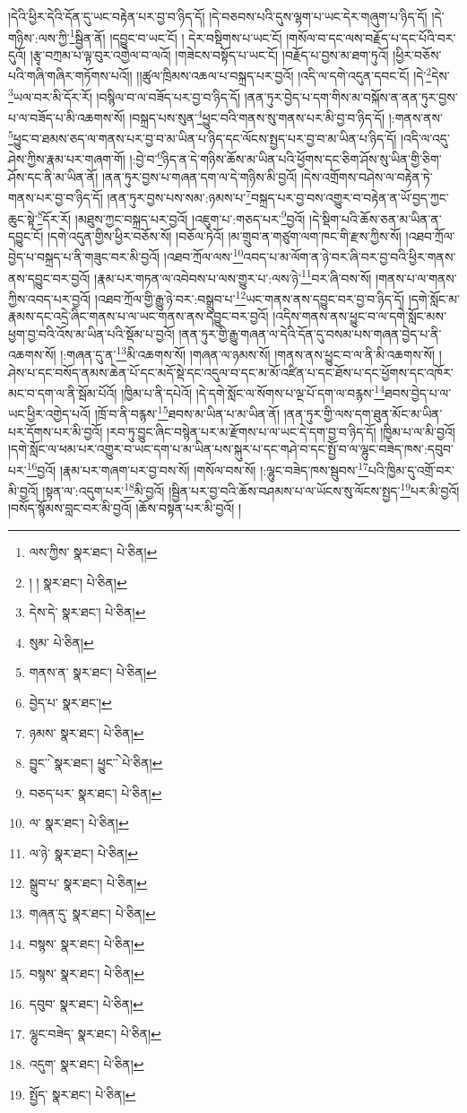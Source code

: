 །དེའི་ཕྱིར་དེའི་དོན་དུ་ཡང་བརྟེན་པར་བྱ་བ་ཉིད་དོ། །དེ་བཅབས་པའི་དུས་ལྷག་པ་ཡང་དེར་གཞུག་པ་ཉིད་དོ། །དེ་གཉིས་:ལས་ཀྱི་\footnote{ལས་ཀྱིས་  སྣར་ཐང་།  པེ་ཅིན། }སྦྱིན་ནོ། །དབྱུང་བ་ཡང་ངོ། །
དེར་བསྡིགས་པ་ཡང་ངོ། །གསོལ་བ་དང་ལས་བརྗོད་པ་དང་པོའི་བར་དུའོ། །རྩྭ་བཀྲམ་པ་ལྟ་བུར་འགྱེལ་བ་ལའོ། །གཟེངས་བསྟོད་པ་ཡང་ངོ། །བརྗོད་པ་བྱས་མ་ཐག་ཏུའོ། །ཕྱིར་བཅོས་པའི་གཞི་གཞིར་གཏོགས་པའོ།། །།ཚུལ་ཁྲིམས་འཆལ་པ་བསྐྲད་པར་བྱའོ། །འདི་ལ་དགེ་འདུན་དབང་ངོ། །དེ་\footnote{། །  སྣར་ཐང་།  པེ་ཅིན། }དེས་\footnote{དེས་དེ་  སྣར་ཐང་།  པེ་ཅིན། }ཡལ་བར་མི་དོར་རོ། །བསྙིལ་བ་ལ་བཟོད་པར་བྱ་བ་ཉིད་དོ། །ནན་ཏུར་བྱེད་པ་དག་གིས་མ་བསྐོས་ན་ནན་ཏུར་བྱས་པ་ལ་བཟོད་པ་མི་འཆགས་སོ། །བསྐྲད་པས་སུན་\footnote{སུམ་  པེ་ཅིན། }ཕྱུང་བའི་གནས་སུ་གནས་པར་མི་བྱ་བ་ཉིད་དོ། །:གནས་ནས་\footnote{གནས་ན་  སྣར་ཐང་།  པེ་ཅིན། }ཕྱུང་བ་ཐམས་ཅད་ལ་གནས་པར་བྱ་བ་མ་ཡིན་པ་ཉིད་དང་ལོངས་སྤྱད་པར་བྱ་བ་མ་ཡིན་པ་ཉིད་དོ། །འདི་ལ་འདུ་ཤེས་ཀྱིས་རྣམ་པར་གཞག་གོ། །:བྱེ་བ་\footnote{བྱེད་པ་  སྣར་ཐང་། }ཉིད་ན་དེ་གཉིས་ཆོས་མ་ཡིན་པའི་ཕྱོགས་དང་ཅིག་ཤོས་སུ་ཡིན་གྱི་ཅིག་ཤོས་དང་ནི་མ་ཡིན་ནོ། །ནན་ཏུར་བྱས་པ་གཞན་དག་ལ་དེ་གཉིས་མི་བྱའོ། །དེས་འགྲོགས་བཤེས་ལ་བརྟེན་ཏེ་གནས་པར་བྱ་བ་ཉིད་དོ། །ནན་ཏུར་བྱས་པས་སམ་:ཉམས་པ་\footnote{ཉམས་  སྣར་ཐང་།  པེ་ཅིན། }བསྐྲད་པར་བྱ་བས་འགྱུར་བ་བརྟེན་ན་ཡོ་བྱད་ཀྱང་ཆུང་སྟེ་\footnote{བྱུང་ེ་  སྣར་ཐང་། ཕྱུང་ེ་  པེ་ཅིན། }དོར་རོ། །མཐུས་ཀྱང་བསྐྲད་པར་བྱའོ། །འཇུག་པ་:གཅད་པར་\footnote{བཅད་པར་  སྣར་ཐང་།  པེ་ཅིན། }བྱའོ། །དེ་སྡིག་པའི་ཆོས་ཅན་མ་ཡིན་ན་དབྱུང་ངོ། །དགེ་འདུན་གྱིས་ཕྱིར་བཅོས་སོ། །བཅོལ་ཏེའོ། །མ་གྲུབ་ན་གཙུག་ལག་ཁང་གི་རྫས་ཀྱིས་སོ། །འཐབ་ཀྲོལ་བྱེད་པ་བསྐྲད་པ་ནི་གཟུང་བར་མི་བྱའོ། །འཐབ་ཀྲོལ་ལས་\footnote{ལ་  སྣར་ཐང་།  པེ་ཅིན། }འབད་པ་མ་ལོག་ན་ཉེ་བར་ཞི་བར་བྱ་བའི་ཕྱིར་གནས་ནས་དབྱུང་བར་བྱའོ། །རྣམ་པར་གཏན་ལ་འབེབས་པ་ལས་གྱུར་པ་:ལས་ཉེ་\footnote{ལ་ཉེ་  སྣར་ཐང་།  པེ་ཅིན། }བར་ཞི་བས་སོ། །གནས་པ་ལ་གནས་ཀྱིས་འབད་པར་བྱའོ། །འཐབ་ཀྲོལ་གྱི་རྒྱུ་ཉེ་བར་:བསྒྲུབ་པ་\footnote{སྒྲུབ་པ་  སྣར་ཐང་།  པེ་ཅིན། }ཡང་གནས་ནས་དབྱུང་བར་བྱ་བ་ཉིད་དོ། །དགེ་སློང་མ་རྣམས་དང་འདྲེ་ཞིང་གནས་པ་ལ་ཡང་གནས་ནས་དབྱུང་བར་བྱའོ། །འདིས་གནས་ནས་ཕྱུང་བ་ལ་དགེ་སློང་མས་ཕྱག་བྱ་བའི་འོས་མ་ཡིན་པའི་སྡོམ་པ་བྱའོ། །ནན་ཏུར་གྱི་རྒྱུ་གཞན་ལ་དེའི་དོན་དུ་བསམ་པས་གཞན་བྱེད་པ་ནི་འཆགས་སོ། །:གཞན་དུ་ན་\footnote{གཞན་དུ་  སྣར་ཐང་།  པེ་ཅིན། }མི་འཆགས་སོ། །གཞན་ལ་ཉམས་སོ། །གནས་ནས་ཕྱུང་བ་ལ་ནི་མི་འཆགས་སོ། །ཤེས་པ་དང་བསོད་ནམས་ཆེན་པོ་དང་མདོ་སྡེ་དང་འདུལ་བ་དང་མ་མོ་འཛིན་པ་དང་ཐོས་པ་དང་ཕྱོགས་དང་འཁོར་མང་བ་དག་ལ་ནི་སྦོམ་པོའོ། །ཁྱིམ་པ་ནི་དཔེའོ། །དེ་དགེ་སློང་ལ་སོགས་པ་ལྔ་པོ་དག་ལ་བརྙས་\footnote{བསྙས་  སྣར་ཐང་།  པེ་ཅིན། }ཐབས་བྱེད་པ་ལ་ཡང་ཕྱིར་འགྱེད་པའོ། །ཁྲོ་བ་ནི་བརྙས་\footnote{བསྙས་  སྣར་ཐང་།  པེ་ཅིན། }ཐབས་མ་ཡིན་པ་མ་ཡིན་ནོ། །ནན་ཏུར་གྱི་ལས་དག་ཐུན་མོང་མ་ཡིན་པར་དོགས་པར་མི་བྱའོ། །རབ་ཏུ་བྱུང་ཞིང་བསྙེན་པར་མ་རྫོགས་པ་ལ་ཡང་དེ་དག་བྱ་བ་ཉིད་དོ། །ཁྱིམ་པ་ལ་མི་བྱའོ། །དགེ་སློང་ལ་ཕམ་པར་འགྱུར་བ་ཡང་དག་པ་མ་ཡིན་པས་སྐུར་པ་དང་གཤེ་བ་དང་སྤྱོ་བ་ལ་ལྷུང་བཟེད་ཁས་:དབུབ་པར་\footnote{དབུབ་  སྣར་ཐང་།  པེ་ཅིན། }བྱའོ། །རྣམ་པར་གཞག་པར་བྱ་བས་སོ། །གསོལ་བས་སོ། །:ལྷུང་བཟེད་ཁས་སྦུབས་\footnote{ལྷུང་བཟེད་  སྣར་ཐང་།  པེ་ཅིན། }པའི་ཁྱིམ་དུ་འགྲོ་བར་མི་བྱའོ། །སྟན་ལ་:འདུག་པར་\footnote{འདུག་  སྣར་ཐང་།  པེ་ཅིན། }མི་བྱའོ། །སྦྱིན་པར་བྱ་བའི་ཆོས་བཤམས་པ་ལ་ཡོངས་སུ་ལོངས་སྤྱད་\footnote{སྤྱོད་  སྣར་ཐང་།  པེ་ཅིན། }པར་མི་བྱའོ། །བསོད་སྙོམས་བླང་བར་མི་བྱའོ། །ཆོས་བསྟན་པར་མི་བྱའོ། །
